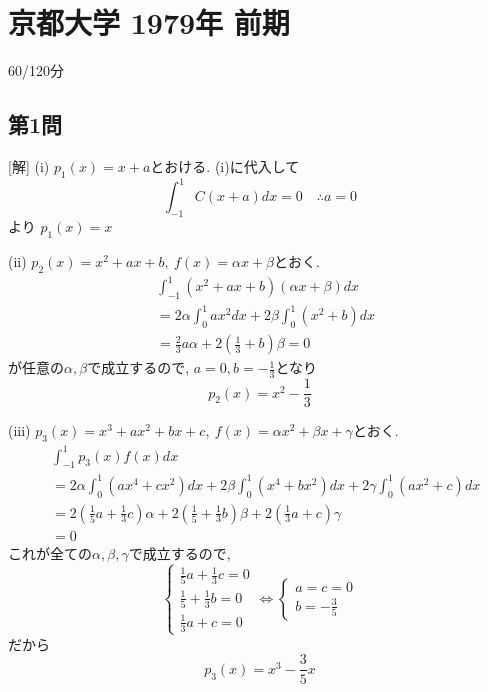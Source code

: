 \documentclass[../main.tex]{subfiles}
\begin{document}
\section*{京都大学 1979年 前期}

\begin{flushright}
  60/120分
\end{flushright}

\subsection*{第1問}
[解] (i) $p_1(x) = x + a$とおける. (i)に代入して
\[
  \int_{-1}^1 C(x+a) dx = 0 \quad \therefore a = 0
\]
より $p_1(x) = x$

(ii) $p_2(x) = x^2 + ax + b, \ f(x) = \alpha x + \beta$とおく.
\begin{align*}
  &\int_{-1}^1 (x^2+ax+b)(\alpha x+\beta) dx \\
  &= 2\alpha \int_0^1 ax^2 dx + 2\beta \int_0^1 (x^2+b) dx \\
  &= \frac{2}{3}a\alpha + 2\left(\frac{1}{3}+b\right)\beta = 0
\end{align*}
が任意の$\alpha, \beta$で成立するので, $a=0, b=-\frac{1}{3}$となり
\[
  p_2(x) = x^2 - \frac{1}{3}
\]

(iii) $p_3(x) = x^3 + ax^2 + bx + c, \ f(x) = \alpha x^2 + \beta x + \gamma$とおく.
\begin{align*}
  &\int_{-1}^1 p_3(x) f(x) dx \\
  &= 2\alpha \int_0^1 (ax^4+cx^2) dx + 2\beta \int_0^1 (x^4+bx^2) dx + 2\gamma \int_0^1 (ax^2+c) dx \\
  &= 2\left(\frac{1}{5}a+\frac{1}{3}c\right)\alpha + 2\left(\frac{1}{5}+\frac{1}{3}b\right)\beta + 2\left(\frac{1}{3}a+c\right)\gamma \\
  &= 0
\end{align*}
これが全ての$\alpha, \beta, \gamma$で成立するので,
\[
  \begin{cases}
    \frac{1}{5}a + \frac{1}{3}c = 0 \\
    \frac{1}{5} + \frac{1}{3}b = 0 \\
    \frac{1}{3}a + c = 0
  \end{cases}
  \iff
  \begin{cases}
    a=c=0 \\
    b=-\frac{3}{5}
  \end{cases}
\]
だから
\[
  p_3(x) = x^3 - \frac{3}{5}x
\]
\end{document}
